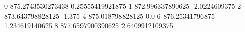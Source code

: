 0 875.2743530273438 0.25555419921875
1 872.996337890625 -2.0224609375
2 873.643798828125 -1.375
4 875.018798828125 0.0
6 876.25341796875 1.234619140625
8 877.6597900390625 2.6409912109375
